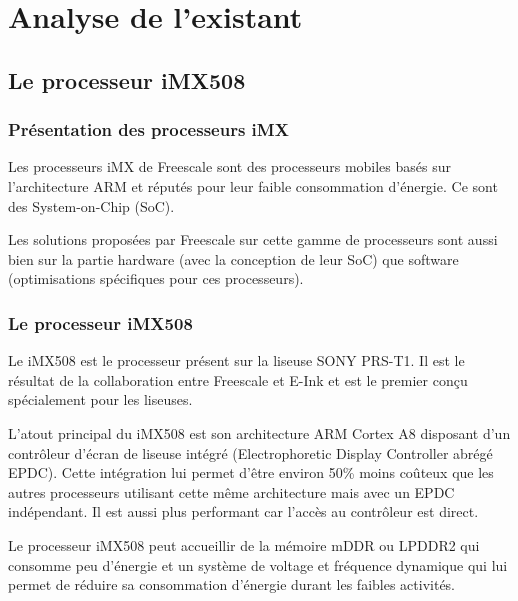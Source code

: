 \chapter{Analyse de l'existant}

\section{Le processeur iMX508}

\subsection{Présentation des processeurs iMX}

Les processeurs iMX de Freescale sont des processeurs mobiles basés sur l'architecture ARM et réputés pour leur faible consommation d'énergie. Ce sont des System-on-Chip (SoC).


Les solutions proposées par Freescale sur cette gamme de processeurs sont aussi bien sur la partie hardware (avec la conception de leur SoC) que software (optimisations spécifiques pour ces processeurs).

\newpage

\subsection{Le processeur iMX508}

Le iMX508 est le processeur présent sur la liseuse SONY PRS-T1. Il est le résultat de la collaboration entre Freescale et E-Ink et est le premier conçu spécialement pour les liseuses. 

L'atout principal du iMX508 est son architecture ARM Cortex A8 disposant d'un contrôleur d'écran de liseuse intégré (Electrophoretic Display Controller abrégé EPDC). Cette intégration lui permet d'être environ 50\% moins coûteux que les autres processeurs utilisant cette même architecture mais avec un EPDC indépendant. Il est aussi plus performant car l'accès au contrôleur est direct.

Le processeur iMX508 peut accueillir de la mémoire mDDR ou LPDDR2 qui consomme peu d'énergie et un système de voltage et fréquence dynamique qui lui permet de réduire sa consommation d'énergie durant les faibles activités.

